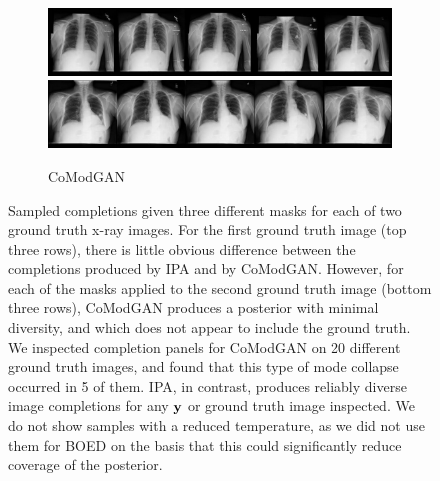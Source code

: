 \begin{figure}[t]
\begin{subfigure}[t]{0.4\textwidth}
    \includegraphics[height=\xrayimgheight]{figs/cigcvae/image-samples/xray/comodgan_5.jpg}
    \includegraphics[height=\xrayimgheight]{figs/cigcvae/image-samples/xray/comodgan_6.jpg}
    \caption{CoModGAN}
  \end{subfigure}
  \caption{Sampled completions given three different masks for each of two
    ground truth x-ray images. For the first ground truth image (top three
    rows), there is little obvious difference between the completions produced
    by IPA and by CoModGAN. However, for each of the masks applied to the second
    ground truth image (bottom three rows), CoModGAN produces a posterior with
    minimal diversity, and which does not appear to include the ground truth. We
    inspected completion panels for CoModGAN on 20 different ground truth
    images, and found that this type of mode collapse occurred in 5 of them.
    IPA, in contrast, produces reliably diverse image completions for any
    $\mathbf{y}{}$ or ground truth image inspected. We do not show samples with a
    reduced temperature, as we did not use them for BOED on the basis that this
    could significantly reduce coverage of the posterior. }
    \label{fig:cigcvae-xray-samples}
  \end{figure}

